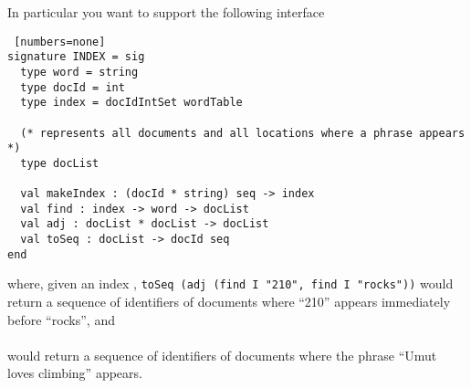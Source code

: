 In particular you want to support the following interface
\begin{lstlisting} [numbers=none]
signature INDEX = sig
  type word = string
  type docId = int
  type index = docIdIntSet wordTable
  
  (* represents all documents and all locations where a phrase appears *)
  type docList

  val makeIndex : (docId * string) seq -> index    
  val find : index -> word -> docList
  val adj : docList * docList -> docList
  val toSeq : docList -> docId seq 
end
\end{lstlisting}
%
where, given an index ,
\texttt{toSeq (adj (find I "210", find I "rocks"))} would return a sequence of
identifiers of documents
where ``210'' appears immediately before ``rocks'', and \\
%
\\
%
would return a sequence of identifiers of documents
where the phrase ``Umut loves climbing'' appears.

